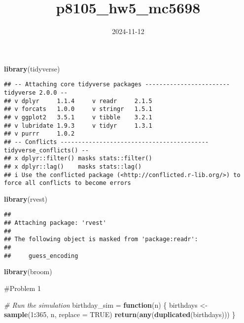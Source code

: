 \documentclass[
]{article}
\title{p8105\_hw5\_mc5698}
\author{}
\date{\vspace{-2.5em}2024-11-12}
\newenvironment{Shaded}{\begin{snugshade}}{\end{snugshade}}
\newcommand{\AttributeTok}[1]{\textcolor[rgb]{0.13,0.29,0.53}{#1}}
\newcommand{\CommentTok}[1]{\textcolor[rgb]{0.56,0.35,0.01}{\textit{#1}}}
\newcommand{\ConstantTok}[1]{\textcolor[rgb]{0.56,0.35,0.01}{#1}}
\newcommand{\ControlFlowTok}[1]{\textcolor[rgb]{0.13,0.29,0.53}{\textbf{#1}}}
\newcommand{\DecValTok}[1]{\textcolor[rgb]{0.00,0.00,0.81}{#1}}
\newcommand{\FunctionTok}[1]{\textcolor[rgb]{0.13,0.29,0.53}{\textbf{#1}}}
\newcommand{\NormalTok}[1]{#1}
\newcommand{\OtherTok}[1]{\textcolor[rgb]{0.56,0.35,0.01}{#1}}
\newcommand{\SpecialCharTok}[1]{\textcolor[rgb]{0.81,0.36,0.00}{\textbf{#1}}}
\begin{document}
\maketitle

\begin{Shaded}
\begin{Highlighting}[]
\FunctionTok{library}\NormalTok{(tidyverse)}
\end{Highlighting}
\end{Shaded}

\begin{verbatim}
## -- Attaching core tidyverse packages ------------------------ tidyverse 2.0.0 --
## v dplyr     1.1.4     v readr     2.1.5
## v forcats   1.0.0     v stringr   1.5.1
## v ggplot2   3.5.1     v tibble    3.2.1
## v lubridate 1.9.3     v tidyr     1.3.1
## v purrr     1.0.2     
## -- Conflicts ------------------------------------------ tidyverse_conflicts() --
## x dplyr::filter() masks stats::filter()
## x dplyr::lag()    masks stats::lag()
## i Use the conflicted package (<http://conflicted.r-lib.org/>) to force all conflicts to become errors
\end{verbatim}

\begin{Shaded}
\begin{Highlighting}[]
\FunctionTok{library}\NormalTok{(rvest)}
\end{Highlighting}
\end{Shaded}

\begin{verbatim}
## 
## Attaching package: 'rvest'
## 
## The following object is masked from 'package:readr':
## 
##     guess_encoding
\end{verbatim}

\begin{Shaded}
\begin{Highlighting}[]
\FunctionTok{library}\NormalTok{(broom)}
\end{Highlighting}
\end{Shaded}

\#Problem 1

\begin{Shaded}
\begin{Highlighting}[]
\CommentTok{\# Run the simulation}
\NormalTok{birthday\_sim }\OtherTok{=} 
  \ControlFlowTok{function}\NormalTok{(n) \{}
\NormalTok{  birthdays }\OtherTok{\textless{}{-}} \FunctionTok{sample}\NormalTok{(}\DecValTok{1}\SpecialCharTok{:}\DecValTok{365}\NormalTok{, n, }\AttributeTok{replace =} \ConstantTok{TRUE}\NormalTok{)}
  \FunctionTok{return}\NormalTok{(}\FunctionTok{any}\NormalTok{(}\FunctionTok{duplicated}\NormalTok{(birthdays))) }
\NormalTok{\}}
\end{Highlighting}
\end{Shaded}
\end{document}
